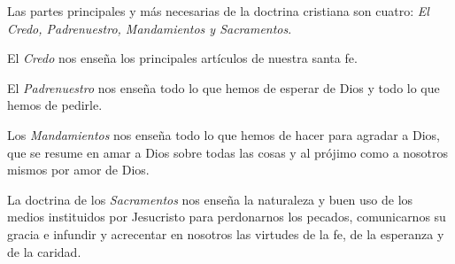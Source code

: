  Las partes principales y más necesarias de la 
doctrina cristiana son cuatro: \textit{El Credo, Padrenuestro, Mandamientos y 
Sacramentos}. 

 El \textit{Credo} nos enseña los principales 
artículos de nuestra santa fe. 

 El \textit{Padrenuestro} nos enseña todo 
lo que hemos de esperar de Dios y todo lo que hemos de pedirle. 

 Los \textit{Mandamientos} nos 
enseña todo lo que hemos de hacer para agradar a Dios, que se resume en 
amar a Dios sobre todas las cosas y al prójimo como a nosotros mismos por 
amor de Dios. 

 La doctrina de 
los \textit{Sacramentos} nos enseña la naturaleza y buen uso de los medios instituidos por Jesucristo para perdonarnos los pecados, comunicarnos su gracia e 
infundir y acrecentar en nosotros las virtudes de la fe, de la esperanza y de la 
caridad. 
